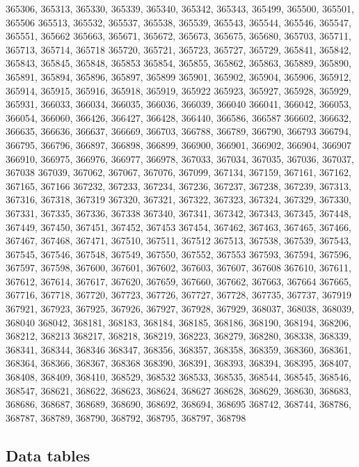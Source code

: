 \documentclass[12pt]{article}
\begin{document}
365306, 365313, 365330, 365339, 365340, 365342, 365343, 365499, 365500, 365501, 365506
365513, 365532, 365537, 365538, 365539, 365543, 365544, 365546, 365547, 365551, 365662
365663, 365671, 365672, 365673, 365675, 365680, 365703, 365711, 365713, 365714, 365718
365720, 365721, 365723, 365727, 365729, 365841, 365842, 365843, 365845, 365848, 365853
365854, 365855, 365862, 365863, 365889, 365890, 365891, 365894, 365896, 365897, 365899
365901, 365902, 365904, 365906, 365912, 365914, 365915, 365916, 365918, 365919, 365922
365923, 365927, 365928, 365929, 365931, 366033, 366034, 366035, 366036, 366039, 366040
366041, 366042, 366053, 366054, 366060, 366426, 366427, 366428, 366440, 366586, 366587
366602, 366632, 366635, 366636, 366637, 366669, 366703, 366788, 366789, 366790, 366793
366794, 366795, 366796, 366897, 366898, 366899, 366900, 366901, 366902, 366904, 366907
366910, 366975, 366976, 366977, 366978, 367033, 367034, 367035, 367036, 367037, 367038
367039, 367062, 367067, 367076, 367099, 367134, 367159, 367161, 367162, 367165, 367166
367232, 367233, 367234, 367236, 367237, 367238, 367239, 367313, 367316, 367318, 367319
367320, 367321, 367322, 367323, 367324, 367329, 367330, 367331, 367335, 367336, 367338
367340, 367341, 367342, 367343, 367345, 367448, 367449, 367450, 367451, 367452, 367453
367454, 367462, 367463, 367465, 367466, 367467, 367468, 367471, 367510, 367511, 367512
367513, 367538, 367539, 367543, 367545, 367546, 367548, 367549, 367550, 367552, 367553
367593, 367594, 367596, 367597, 367598, 367600, 367601, 367602, 367603, 367607, 367608
367610, 367611, 367612, 367614, 367617, 367620, 367659, 367660, 367662, 367663, 367664
367665, 367716, 367718, 367720, 367723, 367726, 367727, 367728, 367735, 367737, 367919
367921, 367923, 367925, 367926, 367927, 367928, 367929, 368037, 368038, 368039, 368040
368042, 368181, 368183, 368184, 368185, 368186, 368190, 368194, 368206, 368212, 368213
368217, 368218, 368219, 368223, 368279, 368280, 368338, 368339, 368341, 368344, 368346
368347, 368356, 368357, 368358, 368359, 368360, 368361, 368364, 368366, 368367, 368368
368390, 368391, 368393, 368394, 368395, 368407, 368408, 368409, 368410, 368529, 368532
368533, 368535, 368544, 368545, 368546, 368547, 368621, 368622, 368623, 368624, 368627
368628, 368629, 368630, 368683, 368686, 368687, 368689, 368690, 368692, 368694, 368695
368742, 368744, 368786, 368787, 368789, 368790, 368792, 368795, 368797, 368798




\subsection{Data tables}
\end{document}
